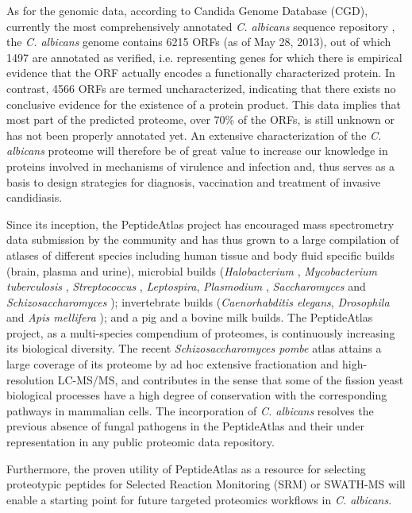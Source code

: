As for the genomic data, according to Candida Genome
Database (CGD), currently the most comprehensively annotated
\textit{C. albicans} sequence repository \citep{Costanzo2006a}, the \textit{C. albicans} genome
contains 6215 ORFs (as of May 28, 2013), out of which 1497 are
annotated as verified, i.e. representing genes for which there is
empirical evidence that the ORF actually encodes a functionally
characterized protein. In contrast, 4566 ORFs are termed
uncharacterized, indicating that there exists no conclusive evidence 
for the existence of a protein product. This data implies
that most part of the predicted proteome, over 70\% of the ORFs, is
still unknown or has not been properly annotated yet. An
extensive characterization of the \textit{C. albicans} proteome will
therefore be of great value to increase our knowledge in proteins
involved in mechanisms of virulence and infection and, thus
serves as a basis to design strategies for diagnosis, vaccination
and treatment of invasive candidiasis.

Since its inception, the PeptideAtlas project \citep{Desiere2006} has 
encouraged mass spectrometry data submission by the community and
has thus grown to a large compilation of atlases of different
species including human tissue and body fluid specific builds
(brain, plasma \citep{Farrah2011} and urine), microbial builds (\textit{Halobacterium} \citep{Van2008a},
\textit{Mycobacterium tuberculosis} \citep{Schubert2013}, \textit{Streptococcus} \citep{Lange2008},
\textit{Leptospira}, \textit{Plasmodium} \citep{Lindner2013}, \textit{Saccharomyces} \citep{King2006}
and \textit{Schizosaccharomyces} \citep{Gunaratne2013b});
invertebrate builds (\textit{Caenorhabditis elegans}, \textit{Drosophila} \citep{Loevenich2009} and
\textit{Apis mellifera} \citep{Chan2011}); and a pig and a bovine milk \citep{Bislev2012} builds. The
PeptideAtlas project, as a multi-species compendium of
proteomes, is continuously increasing its biological diversity.
The recent  \textit{Schizosaccharomyces pombe} atlas \citep{Gunaratne2013b} attains a large
coverage of its proteome by ad hoc extensive fractionation and
high-resolution LC-MS/MS, and contributes in the sense that
some of the fission yeast biological processes have a high degree
of conservation with the corresponding pathways in mammalian
cells. The incorporation of \textit{C. albicans} resolves the previous
absence of fungal pathogens in the PeptideAtlas and their under
representation in any public proteomic data repository.

Furthermore, the proven utility of PeptideAtlas as a resource
for selecting proteotypic peptides for Selected Reaction Monitoring (SRM)
 \citep{Deutsch2008} or SWATH-MS \citep{Gillet2012} will enable a starting point
for future targeted proteomics workflows in \textit{C. albicans}.




